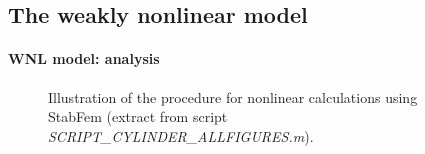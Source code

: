 \documentclass[twocolumn,10pt]{asme2ej}
\begin{document}








\subsection{The weakly nonlinear model}

\paragraph{WNL model: analysis}


\begin{figure}
\small

 \normalsize
\caption{Illustration of the procedure for nonlinear calculations using StabFem (extract from script {{\em SCRIPT\_CYLINDER\_ALLFIGURES.m})}. }
\label{fig:listingNL}
\end{figure}
\end{document}
